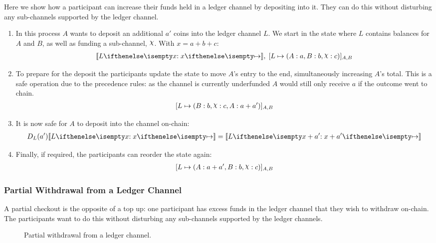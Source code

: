 Here we show how a participant can increase their funds held in a ledger channel by depositing into it.
They can do this without disturbing any sub-channels supported by the ledger channel.
\begin{enumerate}
  \item In this process $A$ wants to deposit an additional $a'$ coins into the ledger channel $L$. We start in the state where $L$ contains balances for $A$ and $B$, as well as funding a sub-channel, $\rchi$. With $x = a + b + c$:
  \begin{align}
    \adj{\holds{L}{x}{}}, \; \finalizable{L}{\alloc{A: a, B: b, \rchi: c}}{A, B}
  \end{align}
  \item To prepare for the deposit the participants update the state to move $A$'s entry to the end, simultaneously increasing $A$'s total. This is a safe operation due to the precedence rules: as the channel is currently underfunded $A$ would still only receive $a$ if the outcome went to chain.
  \begin{align}
    \finalizable{L}{\alloc{B:b, \rchi: c, A: a + a'}}{A,B}
  \end{align}
  \item It is now safe for $A$ to deposit into the channel on-chain:
  \begin{align}
    D_L(a')\adj{\holds{L}{x}{}} = \adj{\holds{L}{x + a'}{}}
  \end{align}
  \item Finally, if required, the participants can reorder the state again:
  \begin{align}
    \finalizable{L}{\alloc{ A: a + a', B: b, \rchi: c}}{A,B}
  \end{align}
\end{enumerate}

\subsubsection{Partial Withdrawal from a Ledger Channel}

A partial checkout is the opposite of a top up: 
one participant has excess funds in the ledger channel that they wish to withdraw on-chain.
The participants want to do this without disturbing any sub-channels supported by the ledger channels.

\begin{figure}[h]\centering
  \makebox[\textwidth][c]{}
  \caption{Partial withdrawal from a ledger channel.}
\end{figure}

